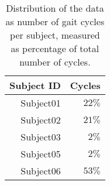 \begin{table}[ht!]
    \centering
    \caption{Distribution of the data as number of gait cycles per subject, measured as percentage of total number of cycles.}
    \label{tab:data-subject-distribution}
    \small
    \begin{tabular}{r | r }
        \textbf{Subject ID}  & \textbf{Cycles}\\ \hline
        Subject01   & $22\%$ \\
        Subject02   & $21\%$ \\ 
        Subject03   & $2\%$ \\ 
        Subject05   & $2\%$ \\ 
        Subject06   & $53\%$ \\ 
    \end{tabular}
\end{table}